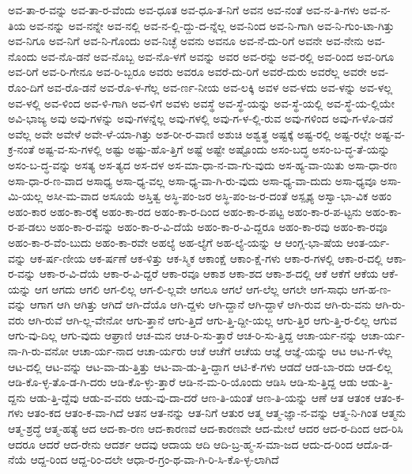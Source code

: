 {ಅವ-ತಾ-ರ-ವನ್ನು
ಅವ-ತಾ-ರ-ವೆಂದು
ಅವ-ಧೂತ
ಅವ-ಧೂ-ತ-ನಿಗೆ
ಅವನ
ಅವ-ನಂತೆ
ಅವ-ನ-ತಿ-ಗಳು
ಅವ-ನ-ತಿಯ
ಅವ-ನನ್ನು
ಅವ-ನನ್ನೇ
ಅವ-ನಲ್ಲಿ
ಅವ-ನ-ಲ್ಲಿ-ದ್ದು-ದ-ನ್ನೆಲ್ಲ
ಅವ-ನಿಂದ
ಅವ-ನಿ-ಗಾಗಿ
ಅವ-ನಿ-ಗುಂ-ಟಾ-ಗಿತ್ತು
ಅವ-ನಿಗೂ
ಅವ-ನಿಗೆ
ಅವ-ನಿ-ಗೊಂದು
ಅವ-ನಿಚ್ಛೆ
ಅವನು
ಅವನೂ
ಅವ-ನೆ-ದು-ರಿಗೆ
ಅವನೇ
ಅವ-ನೇನು
ಅವ-ನೊಂದು
ಅವ-ನೊ-ಡನೆ
ಅವ-ನೊಬ್ಬ
ಅವ-ನೊ-ಳಗೆ
ಅವನ್ನು
ಅವರ
ಅವ-ರನ್ನು
ಅವ-ರಲ್ಲಿ
ಅವ-ರಿಂದ
ಅವ-ರಿಗೂ
ಅವ-ರಿಗೆ
ಅವ-ರಿ-ಗೇನೂ
ಅವ-ರಿ-ಬ್ಬರೂ
ಅವರು
ಅವರೂ
ಅವರೆ-ದು-ರಿಗೆ
ಅವರೆ-ದುರು
ಅವರೆಲ್ಲ
ಅವರೇ
ಅವ-ರೊಂ-ದಿಗೆ
ಅವ-ರೊ-ಡನೆ
ಅವ-ರೊ-ಳ-ಗೆಲ್ಲ
ಅವ-ರ್ಣ-ನೀಯ
ಅವ-ಲಕ್ಕಿ
ಅವಳ
ಅವ-ಳದು
ಅವ-ಳನ್ನು
ಅವ-ಳಲ್ಲ
ಅವ-ಳಲ್ಲಿ
ಅವ-ಳಿಂದ
ಅವ-ಳಿ-ಗಾಗಿ
ಅವ-ಳಿಗೆ
ಅವಳು
ಅವಸ್ಥೆ
ಅವ-ಸ್ಥೆ-ಯನ್ನು
ಅವ-ಸ್ಥೆ-ಯಲ್ಲಿ
ಅವ-ಸ್ಥೆ-ಯ-ಲ್ಲಿಯೇ
ಅವಿ-ಭಾಜ್ಯ
ಅವು
ಅವು-ಗಳನ್ನು
ಅವು-ಗಳನ್ನೆಲ್ಲ
ಅವು-ಗಳಲ್ಲಿ
ಅವು-ಗ-ಳ-ಲ್ಲಿ-ರುವ
ಅವು-ಗಳಿಂದ
ಅವು-ಗ-ಳೊ-ಡನೆ
ಅವೆಲ್ಲ
ಅವೇ
ಅವೇಳೆ
ಅವೇ-ಳೆ-ಯಾ-ಗಿತ್ತು
ಅಶ-ರೀ-ರ-ವಾಣಿ
ಅಶುಚಿ
ಅಶ್ವತ್ಥ
ಅಷ್ಟಕ್ಕೆ
ಅಷ್ಟ-ರಲ್ಲಿ
ಅಷ್ಟ-ರಲ್ಲೇ
ಅಷ್ಟ-ವ-ಕ್ರ-ನಂತೆ
ಅಷ್ಟ-ವ-ಸು-ಗಳಲ್ಲಿ
ಅಷ್ಟು
ಅಷ್ಟು-ಹೊ-ತ್ತಿಗೆ
ಅಷ್ಟೆ
ಅಷ್ಟೇ
ಅಷ್ಟೊಂದು
ಅಸಂ-ಬದ್ಧ
ಅಸಂ-ಬ-ದ್ಧ-ತೆ-ಯನ್ನು
ಅಸಂ-ಬ-ದ್ಧ-ವನ್ನು
ಅಸತ್ಯ
ಅಸ-ತ್ಯದ
ಅಸ-ದಳ
ಅಸ-ಮಾ-ಧಾ-ನ-ವಾ-ಗು-ವುದು
ಅಸ-ಹ್ಯ-ವಾ-ಯಿತು
ಅಸಾ-ಧಾ-ರಣ
ಅಸಾ-ಧಾ-ರ-ಣ-ವಾದ
ಅಸಾಧ್ಯ
ಅಸಾ-ಧ್ಯ-ವಲ್ಲ
ಅಸಾ-ಧ್ಯ-ವಾ-ಗಿ-ರು-ವುದು
ಅಸಾ-ಧ್ಯ-ವಾ-ದುದು
ಅಸಾ-ಧ್ಯವೂ
ಅಸಾ-ಮಿ-ಯಲ್ಲ
ಅಸೀ-ಮ-ವಾದ
ಅಸೂಯೆ
ಅಸ್ತಿತ್ವ
ಅಸ್ಥಿ-ಪಂ-ಜರ
ಅಸ್ಥಿ-ಪಂ-ಜ-ರ-ದಂತೆ
ಅಸ್ಪೃಶ್ಯ
ಅಸ್ವಾ-ಭಾ-ವಿಕ
ಅಹಂ
ಅಹಂ-ಕಾರ
ಅಹಂ-ಕಾ-ರಕ್ಕೆ
ಅಹಂ-ಕಾ-ರದ
ಅಹಂ-ಕಾ-ರ-ದಿಂದ
ಅಹಂ-ಕಾ-ರ-ಪಟ್ಟ
ಅಹಂ-ಕಾ-ರ-ಪ-ಟ್ಟನು
ಅಹಂ-ಕಾ-ರ-ಪ-ಡಲು
ಅಹಂ-ಕಾ-ರ-ವನ್ನು
ಅಹಂ-ಕಾ-ರ-ವಿ-ದೆಯೆ
ಅಹಂ-ಕಾ-ರ-ವಿ-ದ್ದರೂ
ಅಹಂ-ಕಾ-ರವು
ಅಹಂ-ಕಾ-ರವೂ
ಅಹಂ-ಕಾ-ರ-ವೆಂ-ಬುದು
ಅಹಂ-ಕಾ-ರವೇ
ಅಹಲ್ಯೆ
ಅಹ-ಲ್ಯೆಗೆ
ಅಹ-ಲ್ಯೆ-ಯನ್ನು
ಆ
ಆಂಗ್ಲ-ಭಾ-ಷೆಯ
ಆಂತ-ರ್ಯ-ವನ್ನು
ಆಕ-ರ್ಷ-ಣೀಯ
ಆಕ-ರ್ಷಣೆ
ಆಕ-ಳಿತ್ತು
ಆಕ-ಸ್ಮಿಕ
ಆಕಾಂಕ್ಷೆ
ಆಕಾಂ-ಕ್ಷೆ-ಗಳು
ಆಕಾ-ರ-ಗಳಲ್ಲಿ
ಆಕಾ-ರ-ದಲ್ಲಿ
ಆಕಾ-ರ-ವನ್ನು
ಆಕಾ-ರ-ವಿ-ದೆಯೆ
ಆಕಾ-ರ-ವಿ-ದ್ದರೆ
ಆಕಾ-ರವೂ
ಆಕಾಶ
ಆಕಾ-ಶದ
ಆಕಾ-ಶ-ದಲ್ಲಿ
ಆಕೆ
ಆಕೆಗೆ
ಆಕೆಯ
ಆಕೆ-ಯನ್ನು
ಆಗ
ಆಗದು
ಆಗಲಿ
ಆಗ-ಲಿಲ್ಲ
ಆಗ-ಲಿ-ಲ್ಲವೇ
ಆಗಲೂ
ಆಗಲೆ
ಆಗ-ಲೆಲ್ಲ
ಆಗಲೇ
ಆಗ-ಸಾಧು
ಆಗ-ಹ-ಣ-ವನ್ನು
ಆಗಾಗ
ಆಗಿ
ಆಗಿತ್ತು
ಆಗಿದೆ
ಆಗಿ-ದೆಯೊ
ಆಗಿ-ದ್ದಳು
ಆಗಿ-ದ್ದಾನೆ
ಆಗಿ-ದ್ದಾಳೆ
ಆಗಿ-ರುವ
ಆಗಿ-ರು-ವನು
ಆಗಿ-ರು-ವರು
ಆಗಿ-ರುವೆ
ಆಗಿ-ಲ್ಲ-ವೇನೋ
ಆಗು-ತ್ತಾನೆ
ಆಗು-ತ್ತಿದೆ
ಆಗು-ತ್ತಿ-ದ್ದೀ-ಯಲ್ಲ
ಆಗು-ತ್ತಿರ
ಆಗು-ತ್ತಿ-ರ-ಲಿಲ್ಲ
ಆಗುವ
ಆಗು-ವು-ದಿಲ್ಲ
ಆಗು-ವುದು
ಆಘ್ರಾಣಿ
ಆಚ-ಮನ
ಆಚ-ರಿ-ಸು-ತ್ತಾರೆ
ಆಚ-ರಿ-ಸು-ತ್ತಿದ್ದ
ಆಚಾ-ರ್ಯ-ನನ್ನು
ಆಚಾ-ರ್ಯ-ನಾ-ಗಿ-ರು-ವನೋ
ಆಚಾ-ರ್ಯ-ನಾದ
ಆಚಾ-ರ್ಯರು
ಆಚೆ
ಆಚೆಗೆ
ಆಚೆಯ
ಆಜ್ಞೆ
ಆಜ್ಞೆ-ಯನ್ನು
ಆಟ
ಆಟ-ಗ-ಳೆಲ್ಲ
ಆಟ-ದಲ್ಲಿ
ಆಟ-ವನ್ನು
ಆಟ-ವಾ-ಡು-ತ್ತಿತ್ತು
ಆಟ-ವಾ-ಡು-ತ್ತಿ-ದ್ದಾಗ
ಆಟಿ-ಕೆ-ಗಳು
ಆಡದೆ
ಆಡ-ಬಾ-ರದು
ಆಡ-ಲಿಲ್ಲ
ಆಡಿ-ಕೊ-ಳ್ಳ-ತೊ-ಡ-ಗಿ-ದರು
ಆಡಿ-ಕೊ-ಳ್ಳು-ತ್ತಾರೆ
ಆಡಿ-ನ-ಮ-ರಿ-ಯೊಂದು
ಆಡಿಸಿ
ಆಡಿ-ಸು-ತ್ತಿದ್ದ
ಆಡು
ಆಡು-ತ್ತಿ-ದ್ದನು
ಆಡು-ತ್ತಿ-ದ್ದೆವು
ಆಡು-ವ-ವರು
ಆಡು-ವು-ದಾ-ದರೆ
ಆಣ-ತಿ-ಯಂತೆ
ಆಣ-ತಿ-ಯನ್ನು
ಆಣೆ
ಆತ
ಆತಂಕ
ಆತಂ-ಕ-ಗಳು
ಆತಂ-ಕದ
ಆತಂ-ಕ-ವಾ-ಗಿದೆ
ಆತನ
ಆತ-ನನ್ನು
ಆತ-ನಿಗೆ
ಆತುರ
ಆತ್ಮ
ಆತ್ಮ-ಜ್ಞಾ-ನ-ವನ್ನು
ಆತ್ಮ-ನಿ-ಗಿಂತ
ಆತ್ಮನು
ಆತ್ಮ-ಶ್ರದ್ಧೆ
ಆತ್ಮ-ಹತ್ಯೆ
ಆದ
ಆದ-ಕಾ-ರಣ
ಆದ-ಕಾರಣವೆ
ಆದ-ಕಾರಣವೇ
ಆದ-ಮೇಲೆ
ಆದರ
ಆದ-ರ-ದಿಂದ
ಆದ-ರಿಸಿ
ಆದರೂ
ಆದರೆ
ಆದ-ರೇನು
ಆದರ್ಶ
ಆದವು
ಆದಾಯ
ಆದಿ
ಆದಿ-ಬ್ರ-ಹ್ಮ-ಸ-ಮಾ-ಜದ
ಆದು-ದ-ರಿಂದ
ಆದೊ-ಡ-ನೆಯೆ
ಆದ್ದ-ರಿಂದ
ಆದ್ದ-ರಿಂ-ದಲೇ
ಆಧಾ-ರ-ಗ್ರಂ-ಥ-ವಾ-ಗಿ-ರಿ-ಸಿ-ಕೊ-ಳ್ಳ-ಲಾಗಿದೆ
}
